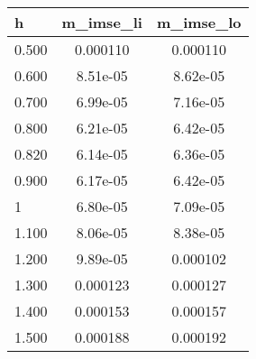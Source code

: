 

\begin{tabular}{lcc} \hline
h & m\_imse\_li & m\_imse\_lo \\ \hline
0.500 & 0.000110 & 0.000110 \\
0.600 & 8.51e-05 & 8.62e-05 \\
0.700 & 6.99e-05 & 7.16e-05 \\
0.800 & 6.21e-05 & 6.42e-05 \\
0.820 & 6.14e-05 & 6.36e-05 \\
0.900 & 6.17e-05 & 6.42e-05 \\
1 & 6.80e-05 & 7.09e-05 \\
1.100 & 8.06e-05 & 8.38e-05 \\
1.200 & 9.89e-05 & 0.000102 \\
1.300 & 0.000123 & 0.000127 \\
1.400 & 0.000153 & 0.000157 \\
 1.500 & 0.000188 & 0.000192 \\ \hline
\end{tabular}

